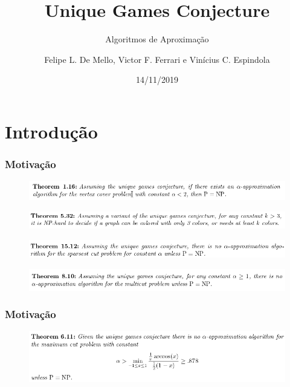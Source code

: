 \documentclass[11pt, handout]{beamer}
\institute{Instituto de Computação -- Unicamp}
\title{Unique Games Conjecture}
\author{Felipe L. De Mello, Victor F. Ferrari e Vinícius C. Espindola}
\subtitle{Algoritmos de Aproximação}
\date{14/11/2019}
\begin{document}
\maketitle


\section{Introdução}

\begin{frame}[<+->]
  \frametitle{Motivação}

\begin{figure}
    \centering
    \includegraphics[width=1\textwidth]{images/vertexcover.png}
    \label{fig:mot1}
\end{figure}{}
\pause
\begin{figure}
    \centering
    \includegraphics[width=1\textwidth]{images/coloring.png}
    \label{fig:mot2}
\end{figure}{}
\pause
\begin{figure}
    \centering
    \includegraphics[width=1\textwidth]{images/sparsest.png}
    \label{fig:mot3}
\end{figure}{}
\pause
\begin{figure}
    \centering
    \includegraphics[width=1\textwidth]{images/multicut.png}
    \label{fig:multicut}
\end{figure}{}

\end{frame}

\begin{frame}
  \frametitle{Motivação}
\begin{figure}
    \centering
    \includegraphics[width=1\textwidth]{images/maxcut.png}
    \label{fig:maxcut}
\end{figure}{}
\end{frame}
\end{document}
